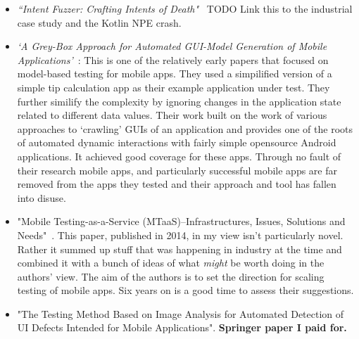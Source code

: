 \begin{itemize}
    \item \emph{``Intent Fuzzer: Crafting Intents of Death"}~\citep{10.1145/2632168.2632169} TODO Link this to the industrial case study and the Kotlin NPE crash.
    
    \item \emph{`A Grey-Box Approach for Automated GUI-Model Generation of Mobile Applications'}~\citep{Yang_Prasad_Xie_2013_grey_box_automated_gui_model_generation_for_mobile_apps}: This is one of the relatively early papers that focused on model-based testing for mobile apps. They used a simpilified version of a simple tip calculation app as their example application under test. They further similify the complexity by ignoring changes in the application state related to different data values. Their work built on the work of various approaches to `crawling' GUIs of an application and provides one of the roots of automated dynamic interactions with fairly simple opensource Android applications. It achieved good coverage for these apps. Through no fault of their research mobile apps, and particularly successful mobile apps are far removed from the apps they tested and their approach and tool has fallen into disuse. %
    
    \item "Mobile Testing-as-a-Service (MTaaS)--Infrastructures, Issues, Solutions and Needs"~\cite{gao2014mobile}. This paper, published in 2014, in my view isn't particularly novel. Rather it summed up stuff that was happening in industry at the time and combined it with a bunch of ideas of what \emph{might} be worth doing in the authors' view. The aim of the authors is to set the direction for scaling testing of mobile apps. Six years on is a good time to assess their suggestions.
    
    \item "The Testing Method Based on Image Analysis for Automated Detection of UI Defects Intended for Mobile Applications". \textbf{Springer paper I paid for.}
    

\end{itemize}
